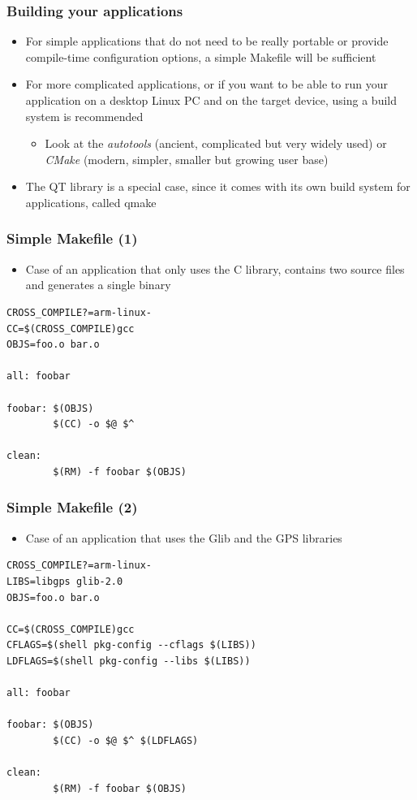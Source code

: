 \begin{frame}
  \frametitle{Building your applications}
  \begin{itemize}
  \item For simple applications that do not need to be really portable
    or provide compile-time configuration options, a simple Makefile
    will be sufficient
  \item For more complicated applications, or if you want to be able
    to run your application on a desktop Linux PC and on the target
    device, using a build system is recommended
    \begin{itemize}
    \item Look at the {\em autotools} (ancient, complicated but very
      widely used) or {\em CMake} (modern, simpler, smaller but
      growing user base)
    \end{itemize}
  \item The QT library is a special case, since it comes with its own
    build system for applications, called qmake
  \end{itemize}
\end{frame}

\begin{frame}[fragile]
  \frametitle{Simple Makefile (1)}
  \begin{itemize}
  \item Case of an application that only uses the C library, contains two source
    files and generates a single binary
  \end{itemize}
\begin{block}{}
\begin{verbatim}
CROSS_COMPILE?=arm-linux-
CC=$(CROSS_COMPILE)gcc
OBJS=foo.o bar.o

all: foobar

foobar: $(OBJS)
        $(CC) -o $@ $^

clean:
        $(RM) -f foobar $(OBJS)
\end{verbatim}
\end{block}
\end{frame}

\begin{frame}[fragile]
  \frametitle{Simple Makefile (2)}
\begin{itemize}
\item Case of an application that uses the Glib and the GPS libraries
\end{itemize}
\small
\begin{block}{}
\begin{verbatim}
CROSS_COMPILE?=arm-linux-
LIBS=libgps glib-2.0
OBJS=foo.o bar.o

CC=$(CROSS_COMPILE)gcc
CFLAGS=$(shell pkg-config --cflags $(LIBS))
LDFLAGS=$(shell pkg-config --libs $(LIBS))

all: foobar

foobar: $(OBJS)
        $(CC) -o $@ $^ $(LDFLAGS)

clean:
        $(RM) -f foobar $(OBJS)
\end{verbatim}
\end{block}
\end{frame}

